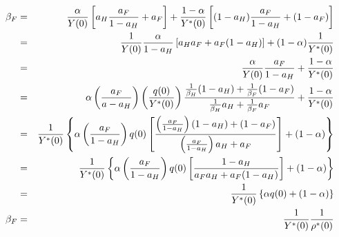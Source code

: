 \documentclass[]{article}
\begin{document}
\begin{eqnarray}
\beta_F &=& \frac{\alpha}{Y(0)}\left[a_H\frac{a_F}{1-a_H}+a_F\right]+\frac{1-\alpha}{Y^*(0)}\left[(1-a_H)\frac{a_F}{1-a_H}+(1-a_F)\right]\notag\\
&=& \frac{1}{Y(0)}\frac{\alpha}{1-a_H}\left[a_Ha_F+a_F(1-a_H)\right]+(1-\alpha)\frac{1}{Y^*(0)}\notag\\
&=& \frac{\alpha}{Y(0)} \frac{a_F}{1-a_H} + \frac{1-\alpha}{Y^*(0)}\notag\\
&=& \alpha \left(\frac{a_F}{a-a_H}\right) \left( \frac{q(0)}{Y^*(0)}\right) \frac{\frac{1}{\beta_H} (1-a_H) + \frac{1}{\beta_F}(1-a_F)}{\frac{1}{\beta_H}a_H+\frac{1}{\beta_F}a_F} + \frac{1-\alpha}{Y^*(0)}\notag\\
&=& \frac{1}{Y^*(0)} \left\{\alpha \left(\frac{a_F}{1-a_H}\right)q(0)\left[\frac{\left(\frac{a_F}{1-a_H}\right)\left(1-a_H\right)+\left(1-a_F\right)}{\left(\frac{a_F}{1-a_H}\right)a_H+a_F}\right]+(1-\alpha)\right\}\notag\\
&=& \frac{1}{Y^*(0)} \left\{\alpha \left(\frac{a_F}{1-a_H}\right)q(0)\left[\frac{1-a_H}{a_Fa_H+a_F(1-a_H)}\right]+(1-\alpha)\right\}\notag\\
&=& \frac{1}{Y^*(0)} \left\{\alpha q(0) + (1-\alpha) \right\}\notag\\
\beta_F &=& \frac{1}{Y^*(0)} \frac{1}{\rho ^*(0)}
\end{eqnarray}
\end{document}
